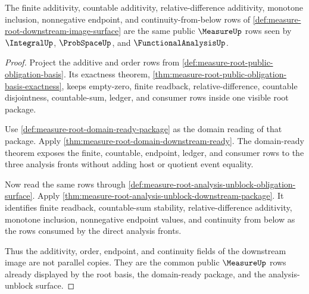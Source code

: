 \begin{theorem}
\label{thm:measure-root-downstream-image-additivity}
The finite additivity, countable additivity, relative-difference additivity,
monotone inclusion, nonnegative endpoint, and continuity-from-below rows of
\autoref{def:measure-root-downstream-image-surface} are the same public
$\MeasureUp$ rows seen by $\IntegralUp$, $\ProbSpaceUp$, and
$\FunctionalAnalysisUp$.
\end{theorem}
\begin{proof}
Project the additive and order rows from
\autoref{def:measure-root-public-obligation-basis}. Its exactness theorem,
\autoref{thm:measure-root-public-obligation-basis-exactness}, keeps
empty-zero, finite readback, relative-difference, countable disjointness,
countable-sum, ledger, and consumer rows inside one visible root package.

Use \autoref{def:measure-root-domain-ready-package} as the domain reading of
that package. Apply \autoref{thm:measure-root-domain-downstream-ready}. The
domain-ready theorem exposes the finite, countable, endpoint, ledger, and
consumer rows to the three analysis fronts without adding host or quotient
event equality.

Now read the same rows through
\autoref{def:measure-root-analysis-unblock-obligation-surface}. Apply
\autoref{thm:measure-root-analysis-unblock-downstream-package}. It identifies
finite readback, countable-sum stability, relative-difference additivity,
monotone inclusion, nonnegative endpoint values, and continuity from below as
the rows consumed by the direct analysis fronts.

Thus the additivity, order, endpoint, and continuity fields of the
downstream image are not parallel copies. They are the common public
$\MeasureUp$ rows already displayed by the root basis, the domain-ready
package, and the analysis-unblock surface.
\end{proof}

